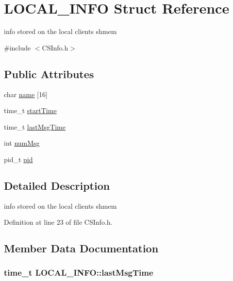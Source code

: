 \hypertarget{structLOCAL__INFO}{
\section{LOCAL\_\-INFO Struct Reference}
\label{structLOCAL__INFO}
}


info stored on the local clients shmem  


{\ttfamily \#include $<$CSInfo.h$>$}\subsection*{Public Attributes}
\begin{DoxyCompactItemize}
\item 
char \hyperlink{structLOCAL__INFO_af1d8383727925dd359e68693c6a048df}{name} \mbox{[}16\mbox{]}
\item 
time\_\-t \hyperlink{structLOCAL__INFO_addc585a8acd1c8a464fceb17fec9791a}{startTime}
\item 
time\_\-t \hyperlink{structLOCAL__INFO_a801d35d4e05580a68c4f562f0a709b9c}{lastMsgTime}
\item 
int \hyperlink{structLOCAL__INFO_a880a5e2ed0fe6cad60a3060b0d5ffcb7}{numMsg}
\item 
pid\_\-t \hyperlink{structLOCAL__INFO_a3fa05f286f9dde4c31ab820ad98a2b7d}{pid}
\end{DoxyCompactItemize}


\subsection{Detailed Description}
info stored on the local clients shmem 

Definition at line 23 of file CSInfo.h.

\subsection{Member Data Documentation}
\hypertarget{structLOCAL__INFO_a801d35d4e05580a68c4f562f0a709b9c}{
\subsubsection[{lastMsgTime}]{\setlength{\rightskip}{0pt plus 5cm}time\_\-t {\bf LOCAL\_\-INFO::lastMsgTime}}}
\label{structLOCAL__INFO_a801d35d4e05580a68c4f562f0a709b9c}



